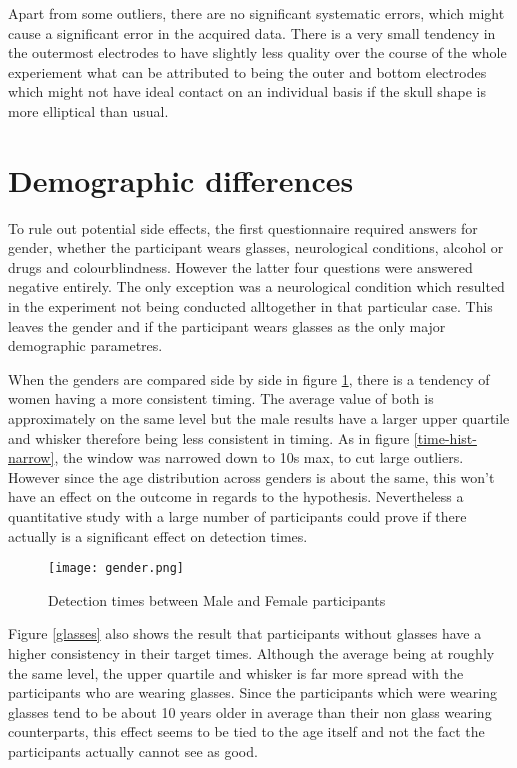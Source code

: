             Apart from some outliers, there are no significant systematic errors, which might cause a significant error in the acquired data. There is a very small tendency in the outermost electrodes to have slightly less quality over the course of the whole experiement what can be attributed to being the outer and bottom electrodes which might not have ideal contact on an individual basis if the skull shape is more elliptical than usual. 

        \section{Demographic differences}\label{demographic-differences}

            To rule out potential side effects, the first questionnaire required answers for gender, whether the participant wears glasses, neurological conditions, alcohol or drugs and colourblindness. However the latter four questions were answered negative entirely. The only exception was a neurological condition which resulted in the experiment not being conducted alltogether in that particular case. This leaves the gender and if the participant wears glasses as the only major demographic parametres.
            
            When the genders are compared side by side in figure \ref*{gender}, there is a tendency of women having a more consistent timing. The average value of both is approximately on the same level but the male results have a larger upper quartile and whisker therefore being less consistent in timing. As in figure \ref*{time-hist-narrow}, the window was narrowed down to 10s max, to cut large outliers. However since the age distribution across genders is about the same, this won't have an effect on the outcome in regards to the hypothesis. Nevertheless a quantitative study with a large number of participants could prove if there actually is a significant effect on detection times.

            \begin{figure}[h]     %
                \centering
                \texttt{[image: gender.png]} 
                \caption{Detection times between Male and Female participants}\label{gender}
            \end{figure} 

            Figure \ref*{glasses} also shows the result that participants without glasses have a higher consistency in their target times. Although the average being at roughly the same level, the upper quartile and whisker is far more spread with the participants who are wearing glasses. Since the participants which were wearing glasses tend to be about 10 years older in average than their non glass wearing counterparts, this effect seems to be tied to the age itself and not the fact the participants actually cannot see as good.

